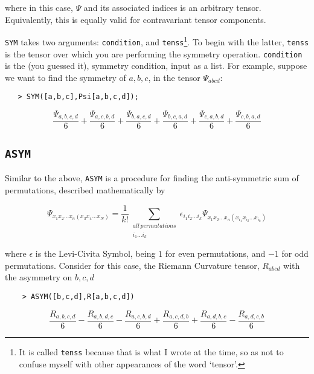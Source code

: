 \documentclass{article}
\begin{document}
where in this case, $\Psi$ and its associated indices is an arbitrary tensor. Equivalently, this is equally valid for contravariant tensor components.

\verb~SYM~ takes two arguments: \verb~condition~, and \verb~tenss~\footnote{It is called \verb~tenss~ because that is what I wrote at the time, so as not to confuse myself with other appearances of the word `tensor'.}. To begin with the latter, \verb~tenss~ is the tensor over which you are performing the symmetry operation. \verb~condition~ is the (you guessed it), symmetry condition, input as a list. For example, suppose we want to find the symmetry of $a,b,c$, in the tensor $\Psi_{abcd}$:

\begin{verbatim}
   > SYM([a,b,c],Psi[a,b,c,d]);
\end{verbatim}
\begin{equation*}
    {\frac {\Psi_{{a,b,c,d}}}{6}}+{\frac {\Psi_{{a,c,b,d}}}{6}}+{\frac {
\Psi_{{b,a,c,d}}}{6}}+{\frac {\Psi_{{b,c,a,d}}}{6}}+{\frac {\Psi_{{c,a
,b,d}}}{6}}+{\frac {\Psi_{{c,b,a,d}}}{6}}
\end{equation*}

\subsection*{\verb~ASYM~}

Similar to the above, \verb~ASYM~ is a procedure for finding the anti-symmetric sum of permutations, described mathematically by

\begin{equation*}
    \Psi_{x_1 x_2 ... x_n (x_3 x_4 ... x_N)} = \frac{1}{k!} \sum_{\substack{all \, permutations \\ i_1 ... i_k}} \epsilon_{i_1 i_2 ... i_k}\Psi_{x_1 x_2 ... x_n (x_{i_1} x_{i_2} ... x_{i_k})}
\end{equation*}

where $\epsilon$ is the Levi-Civita Symbol, being $1$ for even permutations, and $-1$ for odd permutations. Consider for this case, the Riemann Curvature tensor, $R_{abcd}$ with the asymmetry on $b,c,d$

\begin{verbatim}
    > ASYM([b,c,d],R[a,b,c,d])
\end{verbatim}
\begin{equation*}
    {\frac {R_{{a,b,c,d}}}{6}}-{\frac {R_{{a,b,d,c}}}{6}}-{\frac {R_{{a,c,
b,d}}}{6}}+{\frac {R_{{a,c,d,b}}}{6}}+{\frac {R_{{a,d,b,c}}}{6}}-{
\frac {R_{{a,d,c,b}}}{6}}
\end{equation*}
\end{document}
